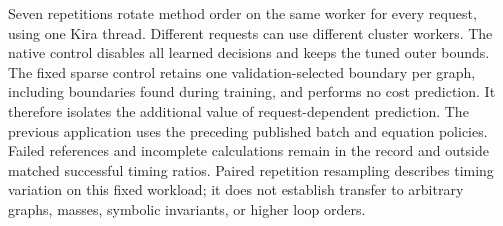 Seven repetitions rotate method order on the same worker for every request, using one Kira thread. Different requests can use different cluster workers. The native control disables all learned decisions and keeps the tuned outer bounds. The fixed sparse control retains one validation-selected boundary per graph, including boundaries found during training, and performs no cost prediction. It therefore isolates the additional value of request-dependent prediction. The previous application uses the preceding published batch and equation policies. Failed references and incomplete calculations remain in the record and outside matched successful timing ratios. Paired repetition resampling describes timing variation on this fixed workload; it does not establish transfer to arbitrary graphs, masses, symbolic invariants, or higher loop orders.
